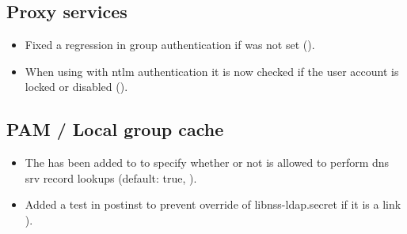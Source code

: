 
\subsection{Proxy services}
\begin{itemize}
\item Fixed a regression in  group authentication if 
was not set ().
\item When using  with ntlm authentication it is now checked if the user account
is locked or disabled ().
\end{itemize}





\subsection{PAM / Local group cache}
\begin{itemize}
\item The  has been added to
 to specify whether or not 
is allowed to perform dns srv record lookups (default: true,
).
\item Added a test in  postinst to prevent override
of libnss-ldap.secret if it is a link ).
\end{itemize}

